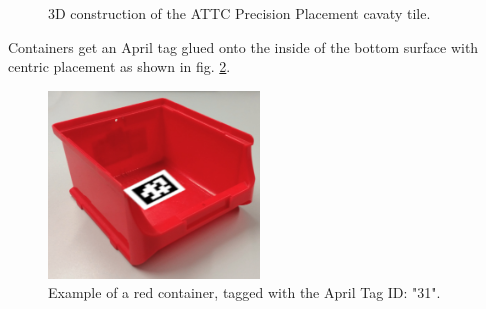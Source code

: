 \begin{figure}[h!]
	\centering
	\hspace{0.05\textwidth}
	\caption{3D construction  of the ATTC Precision Placement cavaty tile.}%
	\label{fig:cubeObjectTile}
\end{figure}

Containers get an April tag glued onto the inside of the bottom surface with centric placement as shown in fig. \ref{fig:redContainerTagged}.

\begin{figure}[h!]
	\centering
	\includegraphics[width= 0.5\textwidth ]{./images/AprilTags/container_redTAG.png}
	\caption{Example of a red container, tagged with the April Tag ID: "31".}
	\label{fig:redContainerTagged}
\end{figure}


